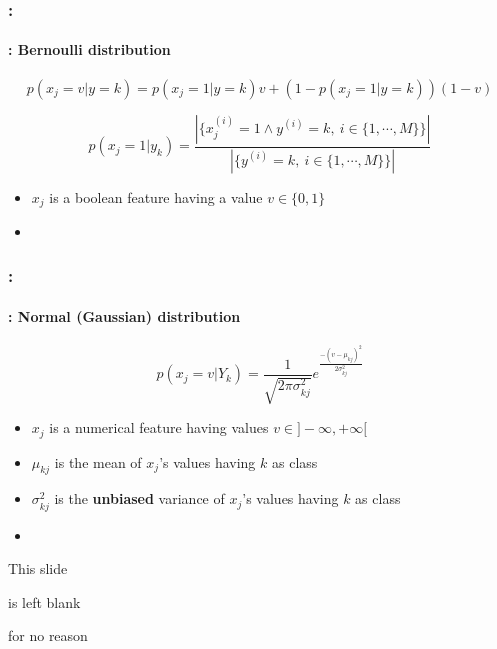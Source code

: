 \documentclass[xcolor=table]{beamer}
\begin{document}
\begin{frame}
	\frametitle{\insertshortsubtitle: \insertsection}
	\framesubtitle{\insertsubsection: Bernoulli distribution}
	
	\[p(x_j=v|y=k) = p(x_j=1|y=k) v + (1-p(x_j=1|y=k)) (1-v)\]
	
	\vfill
	
	\[p(x_j=1|y_k) = \frac{|\{x_j^{(i)} = 1 \wedge y^{(i)} = k,\ i \in \{1, \cdots, M\}\}|}{|\{y^{(i)} = k,\ i \in \{1, \cdots, M\}\}|}\]
	
	\vfill
	
	\begin{itemize}
		\item $x_j$ is a boolean feature having a value $v \in \{0, 1\}$
		\item {}
	\end{itemize}
	
	
\end{frame}

\begin{frame}
	\frametitle{\insertshortsubtitle: \insertsection}
	\framesubtitle{\insertsubsection: Normal (Gaussian) distribution}
	
	\[p(x_j = v|Y_k) = \frac{1}{\sqrt{2\pi \sigma_{kj}^2}} e^\frac{-(v-\mu_{kj})^2}{2 \sigma_{kj}^2}\]
	
	\vfill
	
	\begin{itemize}
		\item $x_j$ is a numerical feature having values $ v \in ]-\infty, +\infty[ $
		\item $\mu_{kj}$ is the mean of $x_j$'s values having $k$ as class
		\item $\sigma_{kj}^2$ is the \textbf{unbiased} variance of $x_j$'s values having $k$ as class
		\item {}
	\end{itemize}
	
	
\end{frame}

\begin{frame}[plain]
	
	\begin{center}
		 
		This slide 
		
		is left blank
		
		for no reason
	\end{center}
	
\end{frame}
\end{document}
